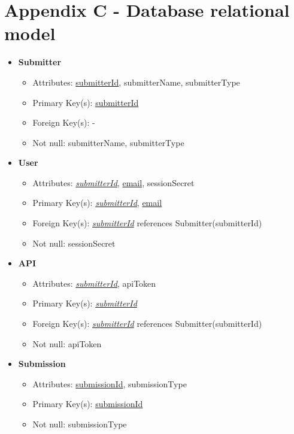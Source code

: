 \section*{Appendix C - Database relational model}
\label{app:relational_model}
    \begin{itemize}
        \item \textbf{Submitter}        
        \begin{itemize}
            \item Attributes: \underline{submitterId}, submitterName, submitterType
            \item Primary Key(s): \underline{submitterId}
            \item Foreign Key(s): -
            \item Not null: submitterName, submitterType
        \end{itemize}

        \item \textbf{User}
        \begin{itemize}
            \item Attributes: \underline{\textit{submitterId}}, \underline{email}, sessionSecret
            \item Primary Key(s): \underline{\textit{submitterId}}, \underline{email}
            \item Foreign Key(s): \underline{\textit{submitterId}} references Submitter(submitterId)
            \item Not null: sessionSecret
        \end{itemize}

        \item \textbf{API}
        \begin{itemize}
            \item Attributes: \underline{\textit{submitterId}}, apiToken
            \item Primary Key(s): \underline{\textit{submitterId}}
            \item Foreign Key(s): \underline{\textit{submitterId}} references Submitter(submitterId)
            \item Not null: apiToken
        \end{itemize}

        \item \textbf{Submission}
        \begin{itemize}
            \item Attributes: \underline{submissionId}, submissionType
            \item Primary Key(s): \underline{submissionId}            
            \item Not null: submissionType
        \end{itemize}


\end{itemize}
